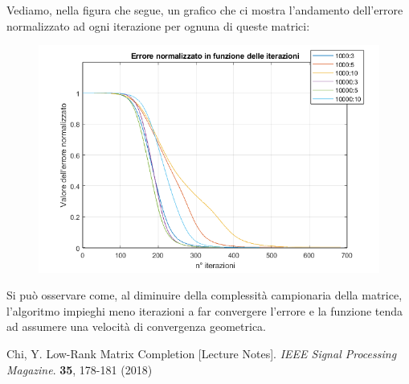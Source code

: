 \documentclass[12pt,a4paper]{report}
\begin{document}
Vediamo, nella figura che segue, un grafico che ci mostra l'andamento dell'errore normalizzato
ad ogni iterazione per ognuna di queste matrici:
\begin{figure}[H]
  \centering
  \includegraphics[width=.75\textwidth]{Figures/errors}
\end{figure}
Si può osservare come, al diminuire della complessità campionaria della matrice,
l'algoritmo impieghi meno iterazioni a far convergere l'errore e la funzione
tenda ad assumere una velocità di convergenza geometrica.




\begin{thebibliography}{9}

  Chi, Y. Low-Rank Matrix Completion [Lecture Notes].
  {\em IEEE Signal Processing Magazine}. \textbf{35}, 178-181 (2018)

\end{thebibliography}
\cleardoublepage{} %
\end{document}
